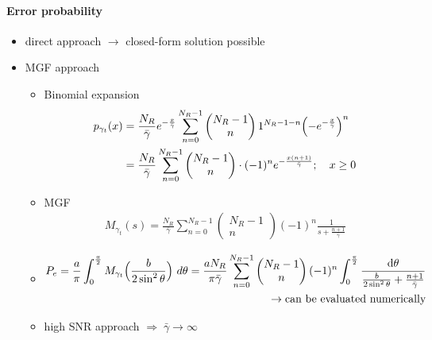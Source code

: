 \documentclass[a4paper, 10pt]{article}
\begin{document}
\paragraph{Error probability}
	\begin{itemize}
		\item direct approach $\rightarrow$ closed-form solution possible
		\item MGF approach
		\begin{itemize}
			\item Binomial expansion\\
			\begin{align*}
				p_{\gamma _t}(x) &= \frac{N_R}{\bar{\gamma}}e^{-\frac{x}{\bar{\gamma}}}\sum_{n = 0}^{N_R - 1}\begin{pmatrix} N_R - 1 \\ n\end{pmatrix} 1^{N_R - 1 - n}\Bigl( -e^{-\frac{x}{\bar{\gamma}}}\Bigr)^n \\
				&= \frac{N_R}{\bar{\gamma}}\sum_{n = 0}^{N_R - 1}\begin{pmatrix}N_R - 1 \\ n\end{pmatrix}\cdot (-1)^{n}e^{-\frac{x(n + 1)}{\bar{\gamma}}};\quad	x \geq 0
			\end{align*}
			\item MGF\\
			\begin{align*}
				M_{\gamma_t}(s) = \frac{N_R}{\bar{\gamma}}\sum_{n = 0}^{N_R - 1}\begin{pmatrix}N_R - 1\\n\end{pmatrix}(-1)^{n}\frac{1}{s + \frac{n+1}{\bar{\gamma}}}
			\end{align*}
			\item 
			\begin{align*}
				P_e = \frac{a}{\pi}\int_{0}^{\frac{\pi}{2}}M_{\gamma _t}\Bigl(\frac{b}{2\sin^2\theta}\Bigr)~d\theta = \frac{aN_R}{\pi\bar{\gamma}}\sum_{n = 0}^{N_R - 1}\begin{pmatrix}N_R - 1\\ n\end{pmatrix} (-1)^{n}\int_{0}^{\frac{\pi}{2}}\frac{\mathrm{d}\theta}{\frac{b}{2\sin^2\theta} + \frac{n + 1}{\bar{\gamma}}}\\ \rightarrow\text{can be evaluated numerically}				
			\end{align*}
		\item high SNR approach $\Rightarrow \; \bar{\gamma}\rightarrow\infty$

\end{itemize}
\end{itemize}
\end{document}
